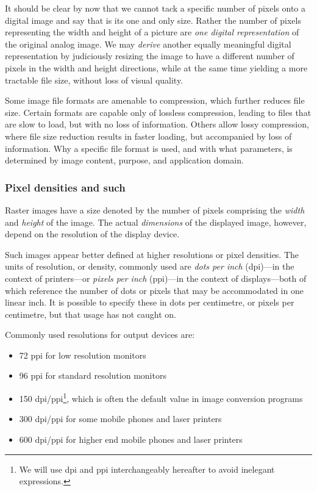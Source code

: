 \documentclass[
  12pt,
  british,
  a4paper,
  rgb,
  dvipsnames,
  svgnames,
  hyphens]{article}
\providecommand{\tightlist}{%
  \setlength{\itemsep}{0pt}\setlength{\parskip}{0pt}}
\begin{document}
It should be clear by now that we cannot tack a specific number of
pixels onto a digital image and say that is its one and only size.
Rather the number of pixels representing the width and height of a
picture are \emph{one digital representation} of the original analog
image. We may \emph{derive} another equally meaningful digital
representation by judiciously resizing the image to have a different
number of pixels in the width and height directions, while at the same
time yielding a more tractable file size, without loss of visual
quality.

Some image file formats are amenable to compression, which further
reduces file size. Certain formats are capable only of lossless
compression, leading to files that are slow to load, but with no loss of
information. Others allow lossy compression, where file size reduction
results in faster loading, but accompanied by loss of information. Why a
specific file format is used, and with what parameters, is determined by
image content, purpose, and application domain.

\hypertarget{pixel-densities-and-such}{%
\subsubsection{Pixel densities and
such}\label{pixel-densities-and-such}}

Raster images have a size denoted by the number of pixels comprising the
\emph{width} and \emph{height} of the image. The actual
\emph{dimensions} of the displayed image, however, depend on the
resolution of the display device.

Such images appear better defined at higher resolutions or pixel
densities. The units of resolution, or density, commonly used are
\emph{dots per inch} (dpi)---in the context of printers---or
\emph{pixels per inch} (ppi)---in the context of displays---both of
which reference the number of dots or pixels that may be accommodated in
one linear inch. It is possible to specify these in dots per centimetre,
or pixels per centimetre, but that usage has not caught on.

Commonly used resolutions for output devices are:

\begin{itemize}
\tightlist
\item
  72 ppi for low resolution monitors
\item
  96 ppi for standard resolution monitors
\item
  150 dpi/ppi\footnote{We will use dpi and ppi interchangeably hereafter
    to avoid inelegant expressions.}, which is often the default value
  in image conversion programs
\item
  300 dpi/ppi for some mobile phones and laser printers
\item
  600 dpi/ppi for higher end mobile phones and laser printers
\end{itemize}
\end{document}
